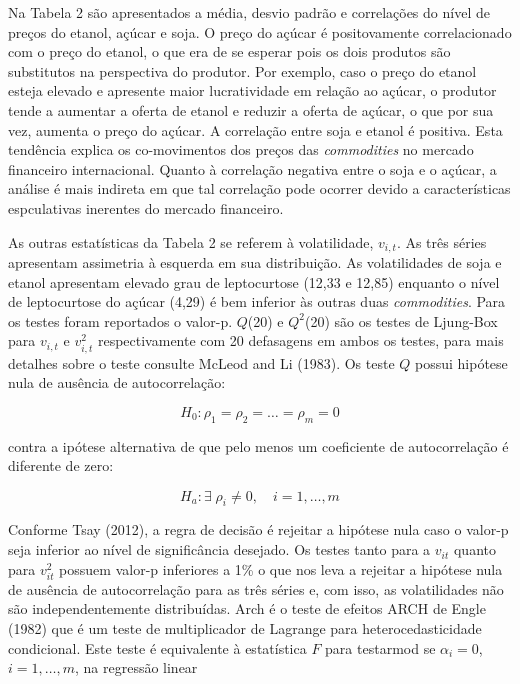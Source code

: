 Na Tabela 2 são apresentados a média, desvio padrão e correlações do
nível de preços do etanol, açúcar e soja. O preço do açúcar é
positovamente correlacionado com o preço do etanol, o que era de se
esperar pois os dois produtos são substitutos na perspectiva do
produtor. Por exemplo, caso o preço do etanol esteja elevado e apresente
maior lucratividade em relação ao açúcar, o produtor tende a aumentar a
oferta de etanol e reduzir a oferta de açúcar, o que por sua vez,
aumenta o preço do açúcar. A correlação entre soja e etanol é positiva.
Esta tendência explica os co-movimentos dos preços das
\emph{commodities} no mercado financeiro internacional. Quanto à
correlação negativa entre o soja e o açúcar, a análise é mais indireta
em que tal correlação pode ocorrer devido a características espculativas
inerentes do mercado financeiro.

As outras estatísticas da Tabela 2 se referem à volatilidade,
\(v_{i,t}\). As três séries apresentam assimetria à esquerda em sua
distribuição. As volatilidades de soja e etanol apresentam elevado grau
de leptocurtose (12,33 e 12,85) enquanto o nível de leptocurtose do
açúcar (4,29) é bem inferior às outras duas \emph{commodities}. Para os
testes foram reportados o valor-p. \(Q\)(20) e \(Q^2\)(20) são os testes
de Ljung-Box para \(v_{i,t}\) e \(v_{i,t}^2\) respectivamente com 20
defasagens em ambos os testes, para mais detalhes sobre o teste consulte
McLeod and Li (1983). Os teste \(Q\) possui hipótese nula de ausência de
autocorrelação:

\begin{equation}
 H_0: \rho_1=\rho_2=\ldots=\rho_m=0
 \end{equation}

contra a ipótese alternativa de que pelo menos um coeficiente de
autocorrelação é diferente de zero:

\begin{equation}
H_a:\exists \;\rho_i\neq 0, \quad i =1,\ldots,m
\end{equation}

Conforme Tsay (2012), a regra de decisão é rejeitar a hipótese nula caso
o valor-p seja inferior ao nível de significância desejado. Os testes
tanto para a \(v_{it}\) quanto para \(v_{it}^2\) possuem valor-p
inferiores a 1\% o que nos leva a rejeitar a hipótese nula de ausência
de autocorrelação para as três séries e, com isso, as volatilidades não
são independentemente distribuídas. Arch é o teste de efeitos ARCH de
Engle (1982) que é um teste de multiplicador de Lagrange para
heterocedasticidade condicional. Este teste é equivalente à estatística
\(F\) para testarmod se \(\alpha_i=0\), \(i=1,\ldots,m\), na regressão
linear


